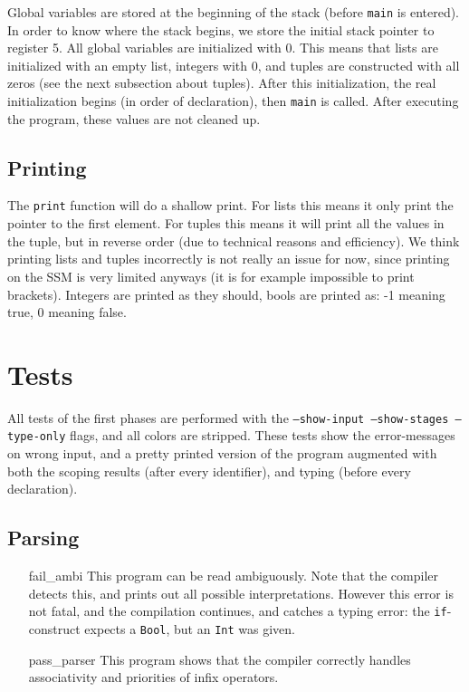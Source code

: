 \documentclass[14pt]{amsart}
\begin{document}
Global variables are stored at the beginning of the stack (before \texttt{main} is entered). In order to know where the stack begins, we store the initial stack pointer to register 5. All global variables are initialized with 0. This means that lists are initialized with an empty list, integers with 0, and tuples are constructed with all zeros (see the next subsection about tuples). After this initialization, the real initialization begins (in order of declaration), then \texttt{main} is called. After executing the program, these values are not cleaned up.

\subsection{Printing}
The \texttt{print} function will do a shallow print. For lists this means it only print the pointer to the first element. For tuples this means it will print all the values in the tuple, but in reverse order (due to technical reasons and efficiency). We think printing lists and tuples incorrectly is not really an issue for now, since printing on the SSM is very limited anyways (it is for example impossible to print brackets). Integers are printed as they should, bools are printed as: -1 meaning true, 0 meaning false.

\section{Tests}
All tests of the first phases are performed with the \texttt{--show-input --show-stages --type-only} flags, and all colors are stripped. These tests show the error-messages on wrong input, and a pretty printed version of the program augmented with both the scoping results (after every identifier), and typing (before every declaration).

\subsection{Parsing}
\begin{itemize}
	\item[fail\_ambi] This program can be read ambiguously. Note that the compiler detects this, and prints out all possible interpretations. However this error is not fatal, and the compilation continues, and catches a typing error: the \texttt{if}-construct expects a \texttt{Bool}, but an \texttt{Int} was given.
	\item[pass\_parser] This program shows that the compiler correctly handles associativity and priorities of infix operators.
\end{itemize}
\end{document}
